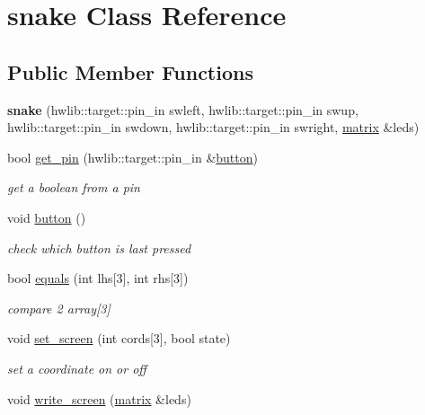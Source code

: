 \hypertarget{classsnake}{}\section{snake Class Reference}
\label{classsnake}
\subsection*{Public Member Functions}
\begin{DoxyCompactItemize}
\item 
\mbox{\label{classsnake_abae0d5a04e9c401b215b24cf66d94131}} 
{\bfseries snake} (hwlib\+::target\+::pin\+\_\+in swleft, hwlib\+::target\+::pin\+\_\+in swup, hwlib\+::target\+::pin\+\_\+in swdown, hwlib\+::target\+::pin\+\_\+in swright, \hyperlink{classmatrix}{matrix} \&leds)
\item 
bool \hyperlink{classsnake_a029848ef2666410aa614fd15164098b3}{get\+\_\+pin} (hwlib\+::target\+::pin\+\_\+in \&\hyperlink{classsnake_a5097f60b9b688f68f512d721b1e5700a}{button})
\begin{DoxyCompactList}\small\item\em get a boolean from a pin \end{DoxyCompactList}\item 
void \hyperlink{classsnake_a5097f60b9b688f68f512d721b1e5700a}{button} ()
\begin{DoxyCompactList}\small\item\em check which button is last pressed \end{DoxyCompactList}\item 
bool \hyperlink{classsnake_a0933aa0958514b5181b782e73a2ac14f}{equals} (int lhs\mbox{[}3\mbox{]}, int rhs\mbox{[}3\mbox{]})
\begin{DoxyCompactList}\small\item\em compare 2 array\mbox{[}3\mbox{]} \end{DoxyCompactList}\item 
void \hyperlink{classsnake_a839b285241756087e4555f7629f85b56}{set\+\_\+screen} (int cords\mbox{[}3\mbox{]}, bool state)
\begin{DoxyCompactList}\small\item\em set a coordinate on or off \end{DoxyCompactList}\item 
\mbox{\label{classsnake_af35f73d7294038a6a3e980708a23dcc6}} 
void \hyperlink{classsnake_af35f73d7294038a6a3e980708a23dcc6}{write\+\_\+screen} (\hyperlink{classmatrix}{matrix} \&leds)

\end{DoxyCompactItemize}
